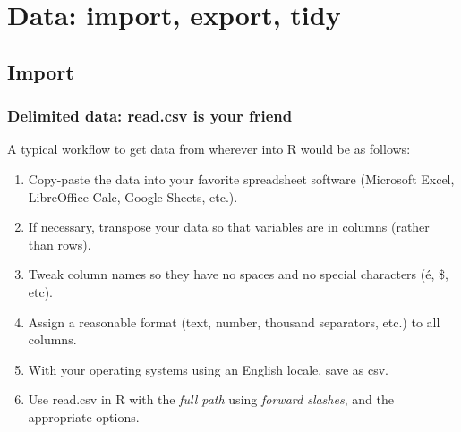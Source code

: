 \documentclass{report}
\newcommand{\code}[1]{\textsf{\ttfamily #1}}
\begin{document}
	\section{Data: import, export, tidy}\label{sec:data-import}	
		\subsection{Import}\label{subsec:import}
		\subsubsection{Delimited data: \code{read.csv} is your friend}
		A typical workflow to get data from wherever into R would be as follows:
		\begin{enumerate}
			\item Copy-paste the data into your favorite spreadsheet software (Microsoft Excel, LibreOffice Calc, Google Sheets, etc.).
			\item If necessary, transpose your data so that variables are in columns (rather than rows).
			\item Tweak column names so they have no spaces and no special characters (é, \$, etc).
			\item Assign a reasonable format (text, number, thousand separators, etc.) to all columns.
			\item With your operating systems using an English locale, save as csv.
			\item Use \code{read.csv} in R with the \emph{full path} using \emph{forward slashes}, and the appropriate options.
		\end{enumerate}
	
\end{document}
